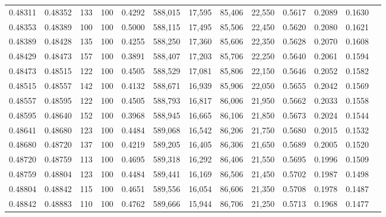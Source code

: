 \begin{tabular}{rrrrrrrrrrrrr}
0.48311 & 0.48352 &    133 & 100 &                                     0.4292 & 588,015 &  17,595 &  85,406 &  22,550 & 0.5617 & 0.2089 & 0.1630 \\
0.48353 & 0.48389 &    100 & 100 &                                     0.5000 & 588,115 &  17,495 &  85,506 &  22,450 & 0.5620 & 0.2080 & 0.1621 \\
0.48389 & 0.48428 &    135 & 100 &                                     0.4255 & 588,250 &  17,360 &  85,606 &  22,350 & 0.5628 & 0.2070 & 0.1608 \\
0.48429 & 0.48473 &    157 & 100 &                                     0.3891 & 588,407 &  17,203 &  85,706 &  22,250 & 0.5640 & 0.2061 & 0.1594 \\
0.48473 & 0.48515 &    122 & 100 &                                     0.4505 & 588,529 &  17,081 &  85,806 &  22,150 & 0.5646 & 0.2052 & 0.1582 \\
0.48515 & 0.48557 &    142 & 100 &                                     0.4132 & 588,671 &  16,939 &  85,906 &  22,050 & 0.5655 & 0.2042 & 0.1569 \\
0.48557 & 0.48595 &    122 & 100 &                                     0.4505 & 588,793 &  16,817 &  86,006 &  21,950 & 0.5662 & 0.2033 & 0.1558 \\
0.48595 & 0.48640 &    152 & 100 &                                     0.3968 & 588,945 &  16,665 &  86,106 &  21,850 & 0.5673 & 0.2024 & 0.1544 \\
0.48641 & 0.48680 &    123 & 100 &                                     0.4484 & 589,068 &  16,542 &  86,206 &  21,750 & 0.5680 & 0.2015 & 0.1532 \\
0.48680 & 0.48720 &    137 & 100 &                                     0.4219 & 589,205 &  16,405 &  86,306 &  21,650 & 0.5689 & 0.2005 & 0.1520 \\
0.48720 & 0.48759 &    113 & 100 &                                     0.4695 & 589,318 &  16,292 &  86,406 &  21,550 & 0.5695 & 0.1996 & 0.1509 \\
0.48759 & 0.48804 &    123 & 100 &                                     0.4484 & 589,441 &  16,169 &  86,506 &  21,450 & 0.5702 & 0.1987 & 0.1498 \\
0.48804 & 0.48842 &    115 & 100 &                                     0.4651 & 589,556 &  16,054 &  86,606 &  21,350 & 0.5708 & 0.1978 & 0.1487 \\
0.48842 & 0.48883 &    110 & 100 &                                     0.4762 & 589,666 &  15,944 &  86,706 &  21,250 & 0.5713 & 0.1968 & 0.1477 \\

\end{tabular}
